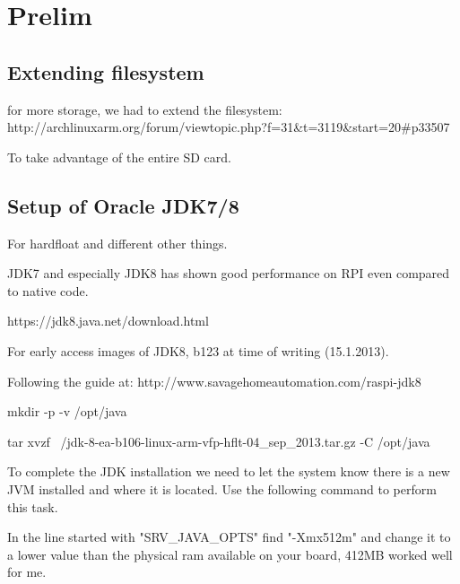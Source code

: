 \section{Prelim}

\subsection{Extending filesystem}
for more storage, we had to extend the filesystem:
http://archlinuxarm.org/forum/viewtopic.php?f=31&t=3119&start=20#p33507

To take advantage of the entire SD card.

\subsection{Setup of Oracle JDK7/8}
For hardfloat and different other things.

JDK7 and especially JDK8 has shown good performance on RPI even compared to native code.

https://jdk8.java.net/download.html

For early access images of JDK8, b123 at time of writing (15.1.2013).

Following the guide at: http://www.savagehomeautomation.com/raspi-jdk8

mkdir -p -v /opt/java

tar xvzf ~/jdk-8-ea-b106-linux-arm-vfp-hflt-04_sep_2013.tar.gz -C /opt/java

To complete the JDK installation we need to let the system know there is a new JVM installed and where it is located.  Use the following command to perform this task.


In the line started with "SRV_JAVA_OPTS" find "-Xmx512m" and change it to a lower value than the physical ram available on your board, 412MB worked well for me.


